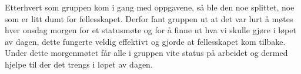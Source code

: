 Etterhvert som gruppen kom i gang med oppgavene, så ble den noe splittet, noe som er litt dumt for fellesskapet. Derfor fant gruppen ut at det var lurt å møtes hver onsdag morgen for et statusmøte og for å finne ut hva vi skulle gjøre i løpet av dagen, dette fungerte veldig effektivt og gjorde at fellesskapet kom tilbake. Under dette morgenmøtet får alle i gruppen vite status på arbeidet og dermed hjelpe til der det trengs i løpet av dagen.


